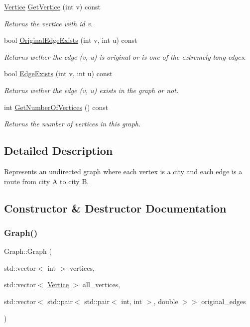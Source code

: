 \begin{DoxyCompactItemize}
$$\hyperlink{classVertice}{Vertice} \hyperlink{classGraph_a58fa12d89f6fd29e48ed2c4be81c5b1e}{Get\+Vertice} (int v) const
\begin{DoxyCompactList}\small\item\em Returns the vertice with id v. \end{DoxyCompactList}\item 
bool \hyperlink{classGraph_a2e0becac02c64bf99f0952bd4da11429}{Original\+Edge\+Exists} (int v, int u) const
\begin{DoxyCompactList}\small\item\em Returns wether the edge (v, u) is original or is one of the extremely long edges. \end{DoxyCompactList}\item 
bool \hyperlink{classGraph_abd80e767eb0d57976cc6b5c87040355a}{Edge\+Exists} (int v, int u) const
\begin{DoxyCompactList}\small\item\em Returns wether the edge (v, u) exists in the graph or not. \end{DoxyCompactList}\item 
\mbox{\label{classGraph_a3b84886e2d970dd5a581f566fabd3bcc}} 
int \hyperlink{classGraph_a3b84886e2d970dd5a581f566fabd3bcc}{Get\+Number\+Of\+Vertices} () const
\begin{DoxyCompactList}\small\item\em Returns the number of vertices in this graph. \end{DoxyCompactList}\end{DoxyCompactItemize}


\subsection{Detailed Description}
Represents an undirected graph where each vertex is a city and each edge is a route from city A to city B. 

\subsection{Constructor \& Destructor Documentation}
\mbox{\label{classGraph_a47d82684ef5ee46d7117c028d277c91a}} 
\subsubsection{\texorpdfstring{Graph()}{Graph()}}
{\footnotesize\ttfamily Graph\+::\+Graph (\begin{DoxyParamCaption}\item[{std\+::vector$<$ int $>$}]{vertices,  }\item[{std\+::vector$<$ \hyperlink{classVertice}{Vertice} $>$}]{all\+\_\+vertices,  }\item[{std\+::vector$<$ std\+::pair$<$ std\+::pair$<$ int, int $>$, double $>$$>$}]{original\+\_\+edges }\end{DoxyParamCaption})}



